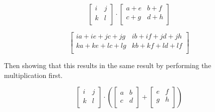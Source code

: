 \documentclass{article}
\begin{document}
        \[
            \left[ {\begin{array}{cc}
                i & j \\
                k & l \\
            \end{array} } \right]
                \cdot
            \left[ {\begin{array}{cc}
                a+e & b+f \\
                c+g & d+h \\
            \end{array} } \right]
        \]

        \[
            \left[ {\begin{array}{cc}
                ia+ie+jc+jg & ib+if+jd+jh\\
                ka+ke+lc+lg & kb+kf+ld+lf \\
            \end{array} } \right]
        \]

        Then showing that this results in the same result by performing the multiplication first.
        
        \[
            \left[ {\begin{array}{cc}
            i & j \\
            k & l \\
            \end{array} } \right]
            \cdot
            \left(
            \left[ {\begin{array}{cc}
                a & b \\
                c & d \\
            \end{array} } \right]
            +
            \left[ {\begin{array}{cc}
                e & f \\
                g & h \\
            \end{array} } \right]
            \right)
        \]
\end{document}
